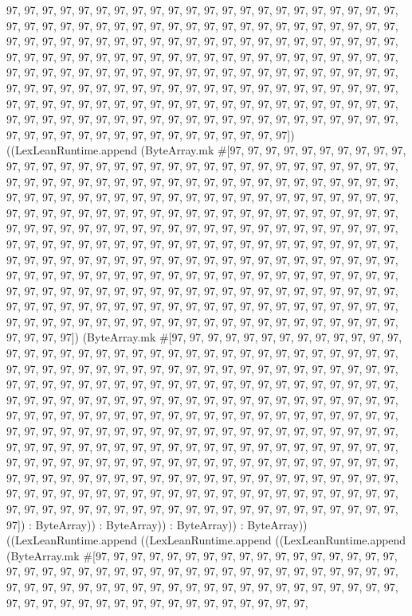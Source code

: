 \documentclass[11pt]{article}
\begin{document}
97, 97, 97, 97, 97, 97, 97, 97, 97, 97, 97, 97, 97, 97, 97, 97, 97, 97, 97, 97, 97, 97, 97, 97, 97, 97, 97, 97, 97, 97, 97, 97, 97, 97, 97, 97, 97, 97, 97, 97, 97, 97, 97, 97, 97, 97, 97, 97, 97, 97, 97, 97, 97, 97, 97, 97, 97, 97, 97, 97, 97, 97, 97, 97, 97, 97, 97, 97, 97, 97, 97, 97, 97, 97, 97, 97, 97, 97, 97, 97, 97, 97, 97, 97, 97, 97, 97, 97, 97, 97, 97, 97, 97, 97, 97, 97, 97, 97, 97, 97, 97, 97, 97, 97, 97, 97, 97, 97, 97, 97, 97, 97, 97, 97, 97, 97, 97, 97, 97, 97, 97, 97, 97, 97, 97, 97, 97, 97, 97, 97, 97, 97, 97, 97, 97, 97, 97, 97, 97, 97, 97, 97, 97, 97, 97, 97, 97, 97, 97, 97, 97, 97, 97, 97, 97, 97, 97, 97, 97, 97, 97, 97, 97, 97, 97, 97, 97, 97, 97, 97, 97, 97, 97, 97, 97, 97, 97, 97, 97, 97, 97, 97, 97, 97, 97, 97, 97, 97, 97, 97, 97, 97]) ((LexLeanRuntime.append (ByteArray.mk \#[97, 97, 97, 97, 97, 97, 97, 97, 97, 97, 97, 97, 97, 97, 97, 97, 97, 97, 97, 97, 97, 97, 97, 97, 97, 97, 97, 97, 97, 97, 97, 97, 97, 97, 97, 97, 97, 97, 97, 97, 97, 97, 97, 97, 97, 97, 97, 97, 97, 97, 97, 97, 97, 97, 97, 97, 97, 97, 97, 97, 97, 97, 97, 97, 97, 97, 97, 97, 97, 97, 97, 97, 97, 97, 97, 97, 97, 97, 97, 97, 97, 97, 97, 97, 97, 97, 97, 97, 97, 97, 97, 97, 97, 97, 97, 97, 97, 97, 97, 97, 97, 97, 97, 97, 97, 97, 97, 97, 97, 97, 97, 97, 97, 97, 97, 97, 97, 97, 97, 97, 97, 97, 97, 97, 97, 97, 97, 97, 97, 97, 97, 97, 97, 97, 97, 97, 97, 97, 97, 97, 97, 97, 97, 97, 97, 97, 97, 97, 97, 97, 97, 97, 97, 97, 97, 97, 97, 97, 97, 97, 97, 97, 97, 97, 97, 97, 97, 97, 97, 97, 97, 97, 97, 97, 97, 97, 97, 97, 97, 97, 97, 97, 97, 97, 97, 97, 97, 97, 97, 97, 97, 97, 97, 97, 97, 97, 97, 97, 97, 97, 97, 97, 97, 97, 97, 97, 97, 97, 97, 97, 97, 97, 97, 97, 97, 97, 97, 97, 97, 97, 97, 97, 97, 97, 97, 97, 97, 97, 97, 97, 97, 97, 97, 97, 97, 97, 97, 97, 97, 97, 97, 97, 97, 97, 97, 97, 97, 97, 97, 97, 97, 97, 97, 97, 97, 97]) (ByteArray.mk \#[97, 97, 97, 97, 97, 97, 97, 97, 97, 97, 97, 97, 97, 97, 97, 97, 97, 97, 97, 97, 97, 97, 97, 97, 97, 97, 97, 97, 97, 97, 97, 97, 97, 97, 97, 97, 97, 97, 97, 97, 97, 97, 97, 97, 97, 97, 97, 97, 97, 97, 97, 97, 97, 97, 97, 97, 97, 97, 97, 97, 97, 97, 97, 97, 97, 97, 97, 97, 97, 97, 97, 97, 97, 97, 97, 97, 97, 97, 97, 97, 97, 97, 97, 97, 97, 97, 97, 97, 97, 97, 97, 97, 97, 97, 97, 97, 97, 97, 97, 97, 97, 97, 97, 97, 97, 97, 97, 97, 97, 97, 97, 97, 97, 97, 97, 97, 97, 97, 97, 97, 97, 97, 97, 97, 97, 97, 97, 97, 97, 97, 97, 97, 97, 97, 97, 97, 97, 97, 97, 97, 97, 97, 97, 97, 97, 97, 97, 97, 97, 97, 97, 97, 97, 97, 97, 97, 97, 97, 97, 97, 97, 97, 97, 97, 97, 97, 97, 97, 97, 97, 97, 97, 97, 97, 97, 97, 97, 97, 97, 97, 97, 97, 97, 97, 97, 97, 97, 97, 97, 97, 97, 97, 97, 97, 97, 97, 97, 97, 97, 97, 97, 97, 97, 97, 97, 97, 97, 97, 97, 97, 97, 97, 97, 97, 97, 97, 97, 97, 97, 97, 97, 97, 97, 97, 97, 97, 97, 97, 97, 97, 97, 97, 97, 97, 97, 97, 97, 97, 97, 97, 97, 97, 97, 97, 97, 97, 97, 97, 97, 97, 97, 97, 97, 97, 97, 97]) : ByteArray)) : ByteArray)) : ByteArray)) : ByteArray)) ((LexLeanRuntime.append ((LexLeanRuntime.append ((LexLeanRuntime.append (ByteArray.mk \#[97, 97, 97, 97, 97, 97, 97, 97, 97, 97, 97, 97, 97, 97, 97, 97, 97, 97, 97, 97, 97, 97, 97, 97, 97, 97, 97, 97, 97, 97, 97, 97, 97, 97, 97, 97, 97, 97, 97, 97, 97, 97, 97, 97, 97, 97, 97, 97, 97, 97, 97, 97, 97, 97, 97, 97, 97, 97, 97, 97, 97, 97, 97, 97, 97, 97, 97, 97, 97, 97, 97, 97, 97, 97, 97, 97, 97, 97, 
\end{document}
